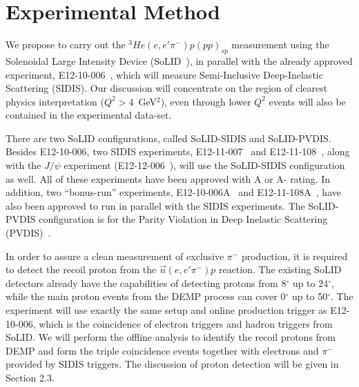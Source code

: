 \section{Experimental Method}

We propose to carry out the $^3He(e,e'\pi^-)p(pp)_{sp}$ measurement using the
Solenoidal Large Intensity Device (SoLID~\cite{solid_pcdr}), in parallel with
the already approved experiment, E12-10-006~\cite{solid:e12-10-006}, which will
measure Semi-Inclusive Deep-Inelastic Scattering (SIDIS). 
Our discussion will concentrate on the region of clearest physics
interpretation ($Q^2>$4~GeV$^2$), even through lower $Q^2$ events will also be
contained in the experimental data-set.

There are two SoLID
configurations, called SoLID-SIDIS and SoLID-PVDIS. Besides E12-10-006, two
SIDIS experiments, E12-11-007~\cite{solid:e12-11-007} and
E12-11-108~\cite{solid:e12-11-108}, along with the $J/\psi$ experiment
(E12-12-006~\cite{solid:e12-12-006}), will use the SoLID-SIDIS
configuration as well. All of these experiments have been approved with A or A-
rating. In addition, two ``bonus-run'' experiments,
E12-10-006A~\cite{solid:e12-10-006A} and E12-11-108A~\cite{solid:e12-11-008A},
have also been approved to run in parallel with the SIDIS experiments. The
SoLID-PVDIS configuration is for the Parity Violation in Deep Inelastic
Scattering (PVDIS)~\cite{solid:e12-10-007}.

In order to assure a clean measurement of exclusive $\pi^-$ production, it is
required to detect the recoil proton from the $\vec{n}(e,e'\pi^-)p$ reaction.
The existing SoLID detectors already have the capabilities of detecting protons from 8$^{\circ}$ up to 24$^{\circ}$,
while the main proton events from the DEMP process can cover 0$^{\circ}$ up to 50$^{\circ}$. 
 The experiment will use
exactly the same setup and online production trigger as E12-10-006, which is
the coincidence of electron triggers and hadron triggers from SoLID. We will
perform the offline analysis to identify the recoil protons from DEMP and form
the triple coincidence events together with electrons and $\pi^{-}$ provided by
SIDIS triggers. The discussion of proton detection will be given in Section 2.3.


